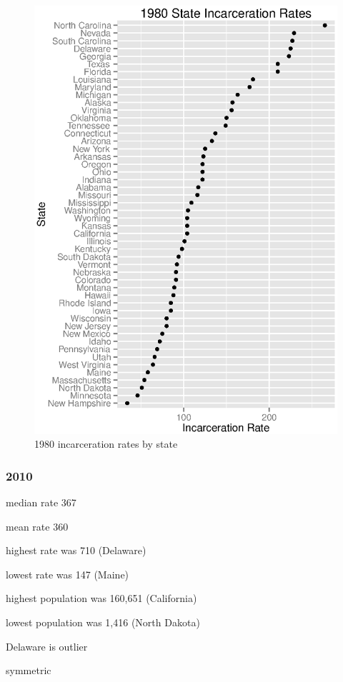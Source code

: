 \documentclass{exam}
\begin{document}
  \begin{figure}[H]
    \centering
    \includegraphics[scale = 0.9]{rate_by_state_1980.eps}
    \caption{1980 incarceration rates by state}
  \end{figure}

  \subsubsection{2010}
  \begin{itemize*}
    \item median rate 367
    \item mean rate 360
    \item highest rate was 710 (Delaware)
    \item lowest rate was 147 (Maine)
    \item highest population was 160,651 (California)
    \item lowest population was 1,416 (North Dakota)
    \item Delaware is outlier
    \item symmetric
  \end{itemize*}
\end{document}
